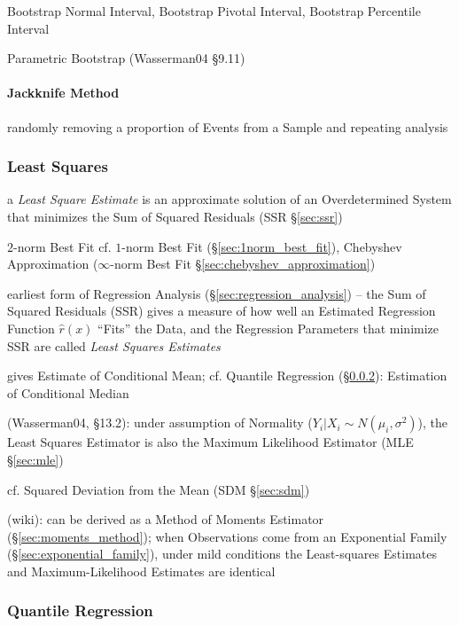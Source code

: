 Bootstrap Normal Interval, Bootstrap Pivotal Interval, Bootstrap Percentile
Interval

Parametric Bootstrap (Wasserman04 \S9.11)



\paragraph{Jackknife Method}\label{sec:jackknife_method}\hfill

randomly removing a proportion of Events from a Sample and repeating analysis



\subsubsection{Least Squares}\label{sec:least_squares}

a \emph{Least Square Estimate} is an approximate solution of an Overdetermined
System that minimizes the Sum of Squared Residuals (SSR \S\ref{sec:ssr})

$2$-norm Best Fit \fist cf. $1$-norm Best Fit (\S\ref{sec:1norm_best_fit}),
Chebyshev Approximation ($\infty$-norm Best Fit
\S\ref{sec:chebyshev_approximation})

earliest form of Regression Analysis (\S\ref{sec:regression_analysis})
-- the Sum of Squared Residuals (SSR) gives a measure of how well
an Estimated Regression Function $\hat{r}(x)$ ``Fits'' the Data, and the
Regression Parameters that minimize SSR are called \emph{Least Squares
  Estimates}

gives Estimate of Conditional Mean; cf. Quantile Regression
(\S\ref{sec:quantile_regression}): Estimation of Conditional Median

(Wasserman04, \S13.2):
 under assumption of Normality ($Y_i | X_i \sim N(\mu_i, \sigma^2)$), the Least
 Squares Estimator is also the Maximum Likelihood Estimator (MLE
 \S\ref{sec:mle})

cf. Squared Deviation from the Mean (SDM \S\ref{sec:sdm})

(wiki): can be derived as a Method of Moments Estimator
(\S\ref{sec:moments_method});
when Observations come from an Exponential Family
(\S\ref{sec:exponential_family}), under mild conditions the Least-squares
Estimates and Maximum-Likelihood Estimates are identical



\subsubsection{Quantile Regression}\label{sec:quantile_regression}

